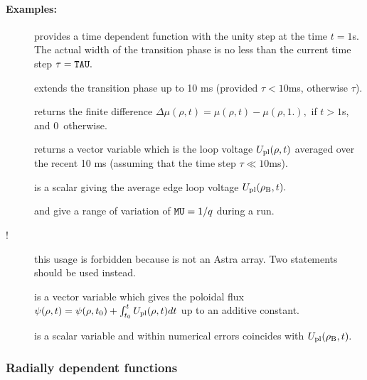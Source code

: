 \paragraph{Examples:}
\begin{description}
\item[\quad{}] 
provides a time dependent function with the unity step at the time
$t=1$s. The actual width of the transition phase is no less than the
current time step $\tau={\tt TAU}.$
\item[\quad{}] extends the transition phase up to 10 ms
(provided $\tau<10$ms, otherwise $\tau$).
\item[\quad{}] 
returns the finite difference 
$\Delta\mu(\rho,t)=\mu(\rho,t)-\mu(\rho,1.),$ if $t>1$s, 
and 0~otherwise.
\item[\quad{}]
returns a vector variable which is the loop voltage 
$U_{\rm pl}(\rho,t)$ averaged over the recent 10 ms (assuming that the time step 
$\tau\ll 10$ms). 
\item[\quad{}] is a scalar giving the average edge loop
voltage $U_{\rm pl}(\rho_{\rm B},t).$ 
\item[\quad{}] and  give a range of
variation of ${\tt MU}=1/q$ during a run.
\item[!\hspace*{9pt}] this usage is forbidden
because  is not an Astra array. 
Two statements 
 should be used instead.
\item[\quad{}] is a vector variable which gives the
poloidal flux 
$\psi(\rho,t)=\psi(\rho,t_0)+\int_{t_0}^tU_{\rm pl}(\rho,t)dt$
up to an additive constant.
\item[\quad{}] is a scalar variable and within numerical errors coincides with 
$U_{\rm pl}(\rho_{\rm B},t).$
\end{description}

\subsubsection{Radially dependent functions}

